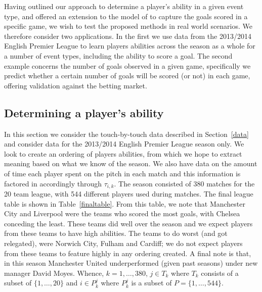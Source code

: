 \documentclass[11pt,a4paper]{article}
\begin{document}
Having outlined our approach to determine a player's ability in a 
given event type, and offered an extension to the model of 
\cite{baio_2010} to capture the goals scored in a specific game, we 
wish to test the proposed methods in real world scenarios. We 
therefore consider two applications. In the first we use data from the 
2013/2014 English Premier League to learn players abilities across the 
season as a whole for a number of event types, including the ability 
to score a goal. The second example concerns the number of goals 
observed in a given game, specifically we predict whether a 
certain number of goals will be scored (or not) in each game, 
offering validation against the betting market.



    \subsection{Determining a player's ability} \label{ability}

In this section we consider the touch-by-touch data described in 
Section~\ref{data} and consider data for the 2013/2014 English Premier 
League season only. We look to create an ordering of players 
abilities, from which we hope to extract meaning based on what we know 
of the season. We also have data on the amount of time each player 
spent on the pitch in each match and this information is factored in 
accordingly through $\tau_{i,k}$. The season consisted of 380 matches 
for the 20 team league, with 544 different players used during matches. 
The final league table is shown in Table~\ref{finaltable}. From this table,
we note that Manchester City and Liverpool were the teams who scored 
the most goals, with Chelsea conceding the least. These teams did well 
over the season and we expect players from these teams to have high 
abilities. The teams to do worst (and got relegated), were Norwich 
City, Fulham and Cardiff; we do not expect players from these teams to 
feature highly in any ordering created. A final note is that, in this 
season Manchester United underperformed (given past seasons) under 
new manager David Moyes. Whence, $k=1,\ldots,380$, $j\in T_k$ where 
$T_k$ consists of a subset of $\{1,\ldots,20\}$ and $i\in P_k^j$ where 
$P_k^j$ is a subset of $P=\{1,\ldots,544\}$.  
\end{document}
